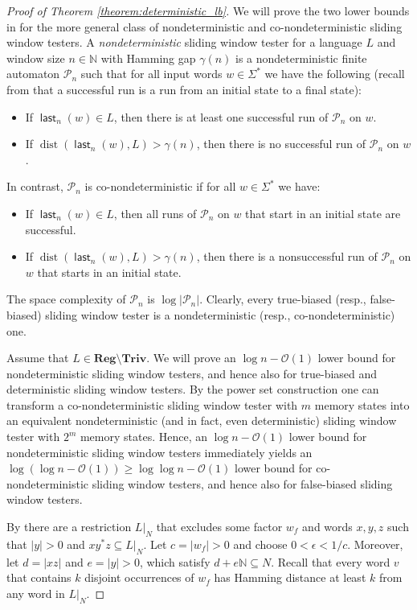 \documentclass{theoretics}
\newcommand{\N}{\mathbb{N}}
\renewcommand{\O}{\mathcal{O}}
\renewcommand{\P}{\mathcal{P}}
\DeclareMathOperator{\last}{\mathsf{last}}
\DeclareMathOperator{\dist}{dist}
\newcommand{\Reg}{\mathbf{Reg}}
\newcommand{\Triv}{\mathbf{Triv}}
\renewcommand{\geq}{\geqslant}
\begin{document}
\begin{proof}[Proof of Theorem \ref{theorem:deterministic_lb}]
We will prove the two lower bounds in 
for the more general class of nondeterministic and co-nondeterministic sliding window testers.
A {\em nondeterministic} sliding window tester for a language $L$
and window size $n \in \N$ with Hamming gap $\gamma(n)$
is a nondeterministic finite automaton $\P_n$ such that for all input words $w \in \Sigma^*$ we have the following (recall from  that a successful
	run is a run from an initial state to a final state):
\begin{itemize}
	\item If $\last_n(w) \in L$, then there is at least one successful run of $\P_n$ on $w$.
	\item If $\dist(\last_n(w),L) > \gamma(n)$, then there is no successful run of $\P_n$ on $w$.
\end{itemize}
In contrast, $\P_n$ is co-nondeterministic if for all $w \in \Sigma^*$ we have:
\begin{itemize}
	\item If $\last_n(w) \in L$, then all runs of $\P_n$ on $w$ that start in an initial state are successful.
	\item If $\dist(\last_n(w),L) > \gamma(n)$, then there is a nonsuccessful run of $\P_n$ on $w$ that starts in an initial state.
\end{itemize}
The space complexity of $\P_n$ is $\log |\P_n|$.
Clearly, every true-biased (resp., false-biased) sliding window tester
is a nondeterministic (resp., co-nondeterministic) one.

Assume that $L \in \Reg\setminus\Triv$.
We will prove an $\log n - \O(1)$ lower bound for nondeterministic sliding window testers,
and hence also for true-biased and deterministic sliding window testers.
By the power set construction one can transform a co-nondeterministic sliding window tester
with $m$ memory states into an equivalent nondeterministic (and in fact, even deterministic) sliding window tester
with $2^m$ memory states. Hence, an $\log n - \O(1)$ lower bound for nondeterministic sliding window testers
immediately yields an $\log (\log n - \O(1)) \geq \log \log n - \O(1)$ lower bound
for co-nondeterministic sliding window testers,
and hence also for false-biased sliding window testers.

By  there 
are a restriction $L|_N$ that excludes some factor $w_f$ and words $x,y,z$ such that $|y|>0$ and 
$x y^* z \subseteq L|_N$. Let $c = |w_f| >0$ and choose $0 < \epsilon < 1/c$. Moreover,
let $d = |xz|$ and $e = |y|>0$, which satisfy $d+e\N \subseteq N$.
Recall that every word $v$ that contains $k$ disjoint occurrences of $w_f$ has Hamming distance
at least $k$ from any word in $L|_N$. 


\end{proof}
\end{document}
